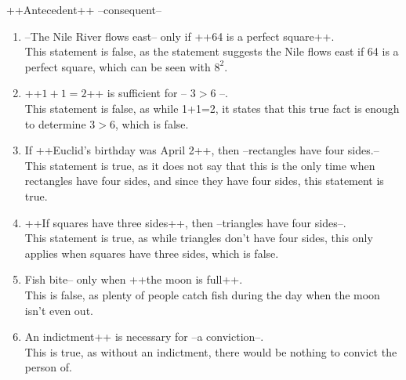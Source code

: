 \documentclass{letter}
\begin{document}
\begin{description}
\begin{enumerate}
                  
                         ++Antecedent++  --consequent-- \\
                         \begin{enumerate}
			\item  --The Nile River flows east-- only if ++64 is a perfect square++. \\ 
                         This statement is false, as the statement suggests the Nile flows east if 64 is a perfect square, which can be seen with $8^2$. \\ 
			\item  ++$1+1=2$++ is sufficient for -- 3$>$6 --. \\ 
                         This statement is false, as while 1+1=2, it states that this true fact is enough to determine $3>6$, which is false. \\
			\item  If ++Euclid's birthday was April 2++, then --rectangles have four sides.-- \\
                         This statement is true, as it does not say that this is the only time when rectangles have four sides, and since they have four sides, this statement is true. \\
			\item  ++If squares have three sides++, then --triangles have four sides--. \\
                          This statement is true, as while triangles don't have four sides, this only applies when squares have three sides, which is false. \\
			\item Fish bite-- only when ++the moon is full++. \\
                          This is false, as plenty of people catch fish during the day when the moon isn't even out. \\
			\item An indictment++ is necessary for --a conviction--. \\
                          This is true, as without an indictment, there would be nothing to convict the person of. \\
	                  

\end{enumerate}
\end{enumerate}
\end{description}
\end{document}
